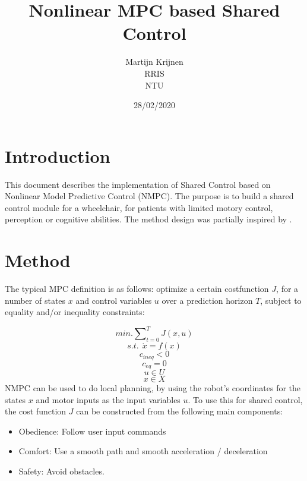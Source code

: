 \documentclass[a4paper,10pt]{article}
\begin{document}
\title{Nonlinear MPC based Shared Control}



\author{Martijn Krijnen \\
RRIS \\
NTU \\
}
\date{28/02/2020}

\maketitle



\section{Introduction}
This document describes the implementation of Shared Control based on Nonlinear Model Predictive Control (NMPC). The purpose is to build a shared control module for a wheelchair, for patients with limited motory control, perception or cognitive abilities. 
The method design was partially inspired by \cite{shared_dwa}.


\section{Method} \label{sec:criteria}
The typical MPC definition is as follows: 
optimize a certain costfunction \( J \), for a number of states \( x \) and control variables \( u \) over a prediction horizon \( T \), subject to equality and/or inequality constraints:

\[ min. \sum\nolimits_{t=0}^{T}J(x,u)\]
\[ s.t. \ \ \dot{x} = f(x) \]		
\[		c_{ineq} < 0 \]
\[		c_{eq} = 0 \]
\[ 		u \in U \]
\[ 		x \in X \]
NMPC can be used to do local planning, by using the robot's coordinates for the states \( x \) and motor inputs as the input variables \( u \). 
To use this for shared control, the cost function \( J \) can be constructed from the following main components:

\begin{itemize}  
\item Obedience: Follow user input commands
\item Comfort: Use a smooth path and smooth acceleration / deceleration
\item Safety: Avoid obstacles.
\end{itemize}
\end{document}
